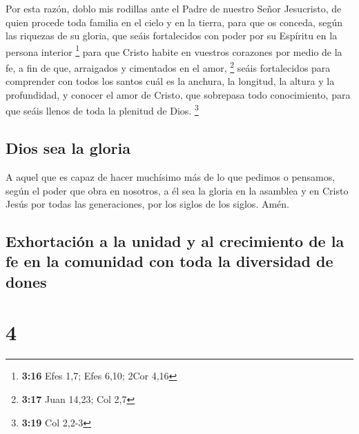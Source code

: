  Por esta razón, doblo mis rodillas ante el Padre de
nuestro Señor Jesucristo,  de quien procede toda familia
en el cielo y en la tierra,  para que os conceda, según
las riquezas de su gloria, que seáis fortalecidos con poder por su
Espíritu en la persona interior \footnote{\textbf{3:16} Efes 1,7; Efes
  6,10; 2Cor 4,16}  para que Cristo habite en vuestros
corazones por medio de la fe, a fin de que, arraigados y cimentados en
el amor, \footnote{\textbf{3:17} Juan 14,23; Col 2,7} 
seáis fortalecidos para comprender con todos los santos cuál es la
anchura, la longitud, la altura y la profundidad,  y
conocer el amor de Cristo, que sobrepasa todo conocimiento, para que
seáis llenos de toda la plenitud de Dios. \footnote{\textbf{3:19} Col
  2,2-3}

\hypertarget{dios-sea-la-gloria}{%
\subsection{Dios sea la gloria}\label{dios-sea-la-gloria}}

 A aquel que es capaz de hacer muchísimo más de lo que
pedimos o pensamos, según el poder que obra en nosotros, 
a él sea la gloria en la asamblea y en Cristo Jesús por todas las
generaciones, por los siglos de los siglos. Amén.

\hypertarget{exhortaciuxf3n-a-la-unidad-y-al-crecimiento-de-la-fe-en-la-comunidad-con-toda-la-diversidad-de-dones}{%
\subsection{Exhortación a la unidad y al crecimiento de la fe en la
comunidad con toda la diversidad de
dones}\label{exhortaciuxf3n-a-la-unidad-y-al-crecimiento-de-la-fe-en-la-comunidad-con-toda-la-diversidad-de-dones}}

\hypertarget{section-3}{%
\section{4}\label{section-3}}

